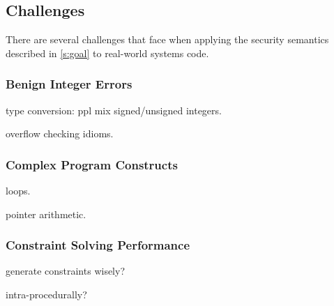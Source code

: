 \subsection{Challenges}
\label{s:chal}

There are several challenges that face \sys when applying the
security semantics described in \autoref{s:goal} to real-world
systems code.

\subsubsection*{Benign Integer Errors}

type conversion: ppl mix signed/unsigned integers.

overflow checking idioms.

\subsubsection*{Complex Program Constructs}

loops.

pointer arithmetic.

\subsubsection*{Constraint Solving Performance}

generate constraints wisely?

intra-procedurally?
